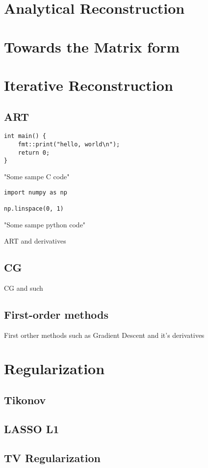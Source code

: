 \section{Analytical Reconstruction}\label{sec:analytical_reconstruction}

\section{Towards the Matrix form}\label{sec:matrix_formulation}

\section{Iterative Reconstruction}\label{sec:iterative_reconstruction}

\subsection{ART}\label{subsec:algebraic_reconstruction_technique}

\begin{listing}
	\begin{verbatim}
int main() {
    fmt::print("hello, world\n");
    return 0;
}
    \end{verbatim}
	\caption{"Some sampe C code"}
\end{listing}
\begin{listing}
	\begin{verbatim}
import numpy as np

np.linspace(0, 1)
    \end{verbatim}
	\caption{"Some sampe python code"}
\end{listing}

ART and derivatives

\subsection{CG}\label{subsec:conjuage_gradient}

CG and such

\subsection{First-order methods}\label{subsec:first_order_methods}

First orther methods such as Gradient Descent and it's derivatives

\section{Regularization}\label{sec:regularization}

\subsection{Tikonov}\label{subsec:tikhonov_regularization}

\subsection{LASSO L1}\label{subsec:l1_regularization}

\subsection{TV Regularization}\label{subsec:tv_regularization}
